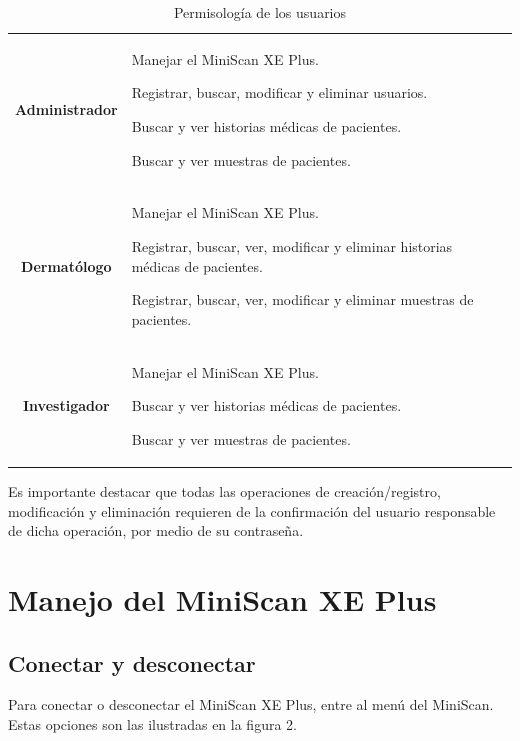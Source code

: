 \begin{table}[h]
		\small
		\caption[Permisolog\'{i}a de los usuarios]{Permisolog\'{i}a de los usuarios}
		\centering
		\setlength{\extrarowheight}{\altocelda}
		\begin{tabulary}{\anchotabla}{|c|J|}
			\hline
			 & \\ \hline
			
			\textbf{Administrador} &
			
			Manejar el MiniScan XE Plus.
			
			Registrar, buscar, modificar y eliminar usuarios.
			
			Buscar y ver historias m\'{e}dicas de pacientes.
			
			Buscar y ver muestras de pacientes.\\ \hline
			
			\textbf{Dermat\'{o}logo} &
			
			Manejar el MiniScan XE Plus.
			
			Registrar, buscar, ver, modificar y eliminar historias m\'{e}dicas de pacientes.
			
			Registrar, buscar, ver, modificar y eliminar muestras de pacientes.\\ \hline
			
			\textbf{Investigador} &
			
			Manejar el MiniScan XE Plus.
			
			Buscar y ver historias m\'{e}dicas de pacientes.
			
			Buscar y ver muestras de pacientes.\\ \hline
		\end{tabulary}
	\end{table}

	Es importante destacar que todas las operaciones de creaci\'{o}n/registro, modificaci\'{o}n y eliminaci\'{o}n requieren de la confirmaci\'{o}n del usuario responsable de dicha operaci\'{o}n, por medio de su contrase\~{n}a.
	
\newpage

\section{Manejo del MiniScan XE Plus}

	\subsection{Conectar y desconectar}
		Para conectar o desconectar el MiniScan XE Plus, entre al men\'{u} del MiniScan. Estas opciones son las ilustradas en la figura 2.

